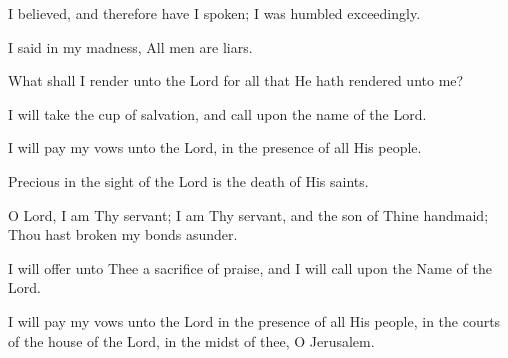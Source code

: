 I believed, and therefore have I spoken; I was humbled exceedingly.

I said in my madness, All men are liars.

What shall I render unto the Lord for all that He hath rendered unto me?

I will take the cup of salvation, and call upon the name of the Lord.

I will pay my vows unto the Lord, in the presence of all His people.

Precious in the sight of the Lord is the death of His saints.

O Lord, I am Thy servant; I am Thy servant, and the son of Thine handmaid; Thou hast broken my bonds asunder.

I will offer unto Thee a sacrifice of praise, and I will call upon the Name of the Lord.

I will pay my vows unto the Lord in the presence of all His people, in the courts of the house of the Lord, in the midst of thee, O Jerusalem.
